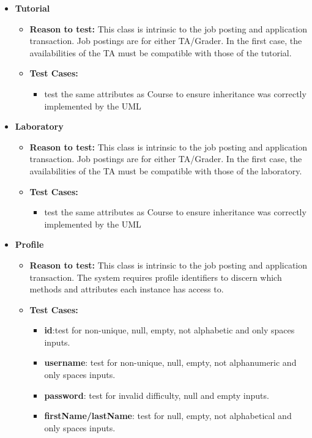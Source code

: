 \documentclass[12pt]{report}
\begin{document}
\begin{itemize}
        \item \textbf{Tutorial}
        \begin{itemize}
            \item \textbf{Reason to test:} This class is intrinsic to the job posting and application transaction. Job postings are for either TA/Grader. In the first case, the availabilities of the TA must be compatible with those of the tutorial.
            \item \textbf{Test Cases:} 
            \begin{itemize}
                \item test the same attributes as Course to ensure inheritance was correctly implemented by the UML
            \end{itemize}
        \end{itemize}
        
        \item \textbf{Laboratory}
        \begin{itemize}
            \item \textbf{Reason to test:} This class is intrinsic to the job posting and application transaction. Job postings are for either TA/Grader. In the first case, the availabilities of the TA must be compatible with those of the laboratory.
            \item \textbf{Test Cases:} 
            \begin{itemize}
                \item test the same attributes as Course to ensure inheritance was correctly implemented by the UML
            \end{itemize}
        \end{itemize}
        
        \item \textbf{Profile}
        \begin{itemize}
            \item \textbf{Reason to test:} This class is intrinsic to the job posting and application transaction. The system requires profile identifiers to discern which methods and attributes each instance has access to.
            \item \textbf{Test Cases:} 
            \begin{itemize}
                \item \textbf{id}:test for non-unique, null, empty, not alphabetic and only spaces inputs.
                \item \textbf{username}: test for non-unique, null, empty, not alphanumeric and only spaces inputs.
                \item \textbf{password}: test for invalid difficulty, null and empty inputs.
                \item \textbf{firstName/lastName}: test for null, empty, not alphabetical and only spaces inputs.
            \end{itemize}
        \end{itemize} 
        

\end{itemize}
\end{document}
